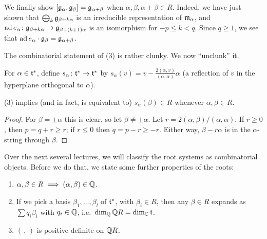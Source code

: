 We finally show $[\mathfrak{g}_\alpha, \mathfrak{g}_\beta] = \mathfrak{g}_{\alpha+\beta}$ when
$\alpha, \beta, \alpha + \beta \in R$. Indeed, we have just shown that
$\bigoplus_k \mathfrak{g}_{\beta + k\alpha}$ is an irreducible representation of
$\mathfrak{m}_\alpha$, and $\operatorname{ad} e_\alpha\colon \mathfrak{g}_{\beta + k\alpha} \to
\mathfrak{g}_{\beta + (k+1)\alpha}$ is an isomorphism for $-p \leq k < q$. Since
$q \geq 1$, we see that $\operatorname{ad} e_\alpha \cdot \mathfrak{g}_\beta = \mathfrak{g}_{\alpha+\beta}$.

\begin{remark}
The combinatorial statement of (3) is rather clunky. We now ``unclunk'' it.

For $\alpha \in \mathfrak{t}^*$, define $s_\alpha\colon \mathfrak{t}^* \to \mathfrak{t}^*$ by
$s_\alpha(v) = v - \frac{2(\alpha, v)}{(\alpha, \alpha)}\alpha$ (a reflection
of $v$ in the hyperplane orthogonal to $\alpha$).
\end{remark}

\begin{claim}
(3) implies (and in fact, is equivalent to) $s_\alpha(\beta) \in R$ whenever
$\alpha, \beta \in R$.
\end{claim}

\begin{proof}
For $\beta = \pm\alpha$ this is clear, so let $\beta \neq \pm\alpha$. Let
$r = 2(\alpha, \beta)/(\alpha, \alpha)$. If $r \geq 0$, then
$p = q + r \geq r$; if $r \leq 0$ then $q = p - r \geq -r$. Either way,
$\beta - r\alpha$ is in the $\alpha$-string through $\beta$.
\end{proof}

Over the next several lectures, we will classify the root systems as
combinatorial objects. Before we do that, we state some further properties of
the roots:

\begin{proposition}\leavevmode
\begin{enumerate}
  \item $\alpha, \beta \in R \implies (\alpha, \beta) \in \mathbb{Q}$.
  \item If we pick a basis $\beta_1, \dots, \beta_l$ of $\mathfrak{t}^*$, with
    $\beta_i \in R$, then any $\beta \in R$ expands as $\sum q_i\beta_i$ with
    $q_i \in \mathbb{Q}$, i.e.\ $\dim_{\mathbb{Q}} \mathbb{Q} R = \dim_{\mathbb{C}} \mathfrak{t}$.
  \item $(\,,\,)$ is positive definite on $\mathbb{Q} R$.
\end{enumerate}
\end{proposition}



